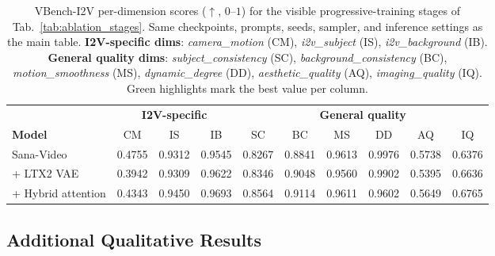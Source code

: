 \documentclass{llmxive}
\providecommand{\rankfirst}[1]{\cellcolor{assistantcolor!32}#1}
\providecommand{\arraystretch}{1.10}
\begin{document}
\begin{table}[htbp]
  \centering
  \scriptsize
  \setlength{\tabcolsep}{4pt}
  \renewcommand{\arraystretch}{1.05}
  \begin{tabular}{@{}l ccc ccc ccc@{}}
    \toprule
    & \multicolumn{3}{c}{\textbf{I2V-specific}} & \multicolumn{6}{c}{\textbf{General quality}} \\
    \cmidrule(lr){2-4} \cmidrule(l){5-10}
    \textbf{Model} & CM & IS & IB & SC & BC & MS & DD & AQ & IQ \\
    \midrule
    Sana-Video        & \rankfirst{0.4755} & 0.9312       & 0.9545       & 0.8267       & 0.8841       & \rankfirst{0.9613} & \rankfirst{0.9976} & \rankfirst{0.5738} & 0.6376 \\
    + LTX2 VAE        & 0.3942       & 0.9309       & 0.9622       & 0.8346       & 0.9048       & 0.9560       & 0.9902       & 0.5395       & 0.6636 \\
    + Hybrid attention& 0.4343       & \rankfirst{0.9450} & \rankfirst{0.9693} & \rankfirst{0.8564} & \rankfirst{0.9114} & 0.9611       & 0.9602       & 0.5649       & \rankfirst{0.6765} \\
    \bottomrule
  \end{tabular}
\caption{VBench-I2V per-dimension scores ($\uparrow$, $0$--$1$) for the visible progressive-training stages of Tab.~\ref{tab:ablation_stages}. Same checkpoints, prompts, seeds, sampler, and inference settings as the main table. \textbf{I2V-specific dims}: \emph{camera\_motion} (CM), \emph{i2v\_subject} (IS), \emph{i2v\_background} (IB). \textbf{General quality dims}: \emph{subject\_consistency} (SC), \emph{background\_consistency} (BC), \emph{motion\_smoothness} (MS), \emph{dynamic\_degree} (DD), \emph{aesthetic\_quality} (AQ), \emph{imaging\_quality} (IQ). Green highlights mark the best value per column.}
\label{tab:ablation_stages_perdim}
\end{table}




















\subsection{Additional Qualitative Results}
\label{sec:appendix_qualitative}
\end{document}
